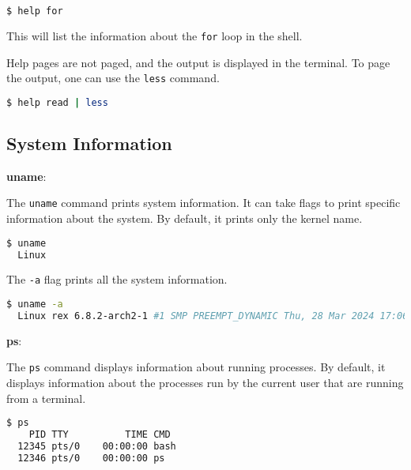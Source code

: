 \begin{lstlisting}[language=bash]
$ help for
\end{lstlisting}

This will list the information about the \lstinline|for| loop in the shell.

Help pages are not paged, and the output is displayed in the terminal.
To page the output, one can use the \lstinline|less| command.

\begin{lstlisting}[language=bash]
$ help read | less
\end{lstlisting}


\subsection{System Information}

\textbf{uname}:

The \lstinline|uname| command prints system information.
It can take flags to print specific information about the system.
By default, it prints only the kernel name.

\begin{lstlisting}[language=bash]
  $ uname
  Linux
\end{lstlisting}

The \lstinline|-a| flag prints all the system information.

\begin{lstlisting}[language=bash]
  $ uname -a
  Linux rex 6.8.2-arch2-1 #1 SMP PREEMPT_DYNAMIC Thu, 28 Mar 2024 17:06:35 +0000 x86_64 GNU/Linux
\end{lstlisting}

\textbf{ps}:

The \lstinline|ps| command displays information about running processes.
By default, it displays information about the processes run by the current user that are running from a terminal.

\begin{lstlisting}[language=bash]
  $ ps
    PID TTY          TIME CMD
  12345 pts/0    00:00:00 bash
  12346 pts/0    00:00:00 ps
\end{lstlisting}

